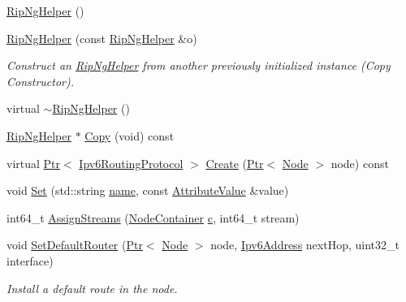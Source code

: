 \begin{DoxyCompactItemize}
\item 
\hyperlink{classns3_1_1RipNgHelper_a0087c857ab88c802641b2d3dade1e8a4}{Rip\+Ng\+Helper} ()
\item 
\hyperlink{classns3_1_1RipNgHelper_a7f2151e3f741afc24b3afe6232f28fc0}{Rip\+Ng\+Helper} (const \hyperlink{classns3_1_1RipNgHelper}{Rip\+Ng\+Helper} \&o)
\begin{DoxyCompactList}\small\item\em Construct an \hyperlink{classns3_1_1RipNgHelper}{Rip\+Ng\+Helper} from another previously initialized instance (Copy Constructor). \end{DoxyCompactList}\item 
virtual \hyperlink{classns3_1_1RipNgHelper_a05db8eeb40a44e2ba8334b121b8c3ec9}{$\sim$\+Rip\+Ng\+Helper} ()
\item 
\hyperlink{classns3_1_1RipNgHelper}{Rip\+Ng\+Helper} $\ast$ \hyperlink{classns3_1_1RipNgHelper_a5a1c7104dea83c98eee84d4b7be1f308}{Copy} (void) const 
\item 
virtual \hyperlink{classns3_1_1Ptr}{Ptr}$<$ \hyperlink{classns3_1_1Ipv6RoutingProtocol}{Ipv6\+Routing\+Protocol} $>$ \hyperlink{classns3_1_1RipNgHelper_a92474bbd2a8816e8e847deb32f240525}{Create} (\hyperlink{classns3_1_1Ptr}{Ptr}$<$ \hyperlink{classns3_1_1Node}{Node} $>$ node) const 
\item 
void \hyperlink{classns3_1_1RipNgHelper_a878cd9a4171c1e53a9895cff51e0efd9}{Set} (std\+::string \hyperlink{generate__test__data__lte__spectrum__model_8m_ab74e6bf80237ddc4109968cedc58c151}{name}, const \hyperlink{classns3_1_1AttributeValue}{Attribute\+Value} \&value)
\item 
int64\+\_\+t \hyperlink{classns3_1_1RipNgHelper_a599fc9843d952e4354ecea4c8a13871c}{Assign\+Streams} (\hyperlink{classns3_1_1NodeContainer}{Node\+Container} \hyperlink{mmwave_2model_2fading-traces_2fading__trace__generator_8m_ae0323a9039add2978bf5b49550572c7c}{c}, int64\+\_\+t stream)
\item 
void \hyperlink{classns3_1_1RipNgHelper_a45af681e6b6955e43f2060609156d985}{Set\+Default\+Router} (\hyperlink{classns3_1_1Ptr}{Ptr}$<$ \hyperlink{classns3_1_1Node}{Node} $>$ node, \hyperlink{classns3_1_1Ipv6Address}{Ipv6\+Address} next\+Hop, uint32\+\_\+t interface)
\begin{DoxyCompactList}\small\item\em Install a default route in the node. \end{DoxyCompactList}\item 

\end{DoxyCompactItemize}
